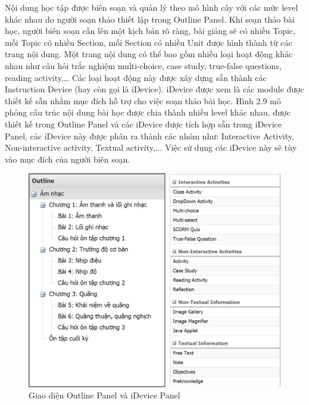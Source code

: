 Nội dung học tập được biên soạn và quản lý theo mô hình cây với các mức level khác nhau do người soạn thảo thiết lập trong Outline Panel. Khi soạn thảo bài học, người biên soạn cần lên một kịch bản rõ ràng, bài giảng sẽ có nhiều Topic, mỗi Topic có nhiều Section, mỗi Section có nhiều Unit được hình thành từ các trang nội dung. Một trang nội dung có thể bao gồm nhiều loại hoạt động khác nhau như câu hỏi trắc nghiệm multi-choice, case study, true-false questions, reading activity,… Các loại hoạt động này được xây dựng sẵn thành các Instruction Device (hay còn gọi là iDevice). iDevice được xem là các module được thiết kế sẵn nhằm mục đích hỗ trợ cho việc soạn thảo bài học. Hình 2.9 mô phỏng cấu trúc nội dung bài học được chia thành nhiều level khác nhau, được thiết kế trong Outline Panel và các iDevice được tích hợp sẵn trong iDevice Panel, các iDevice này được phân ra thành các nhóm như: Interactive Activity, Non-interactive activity, Textual activity,... Việc sử dụng các iDevice này sẽ tùy vào mục đích của người biên soạn.

\newpage

\begin{center}
	\begin{figure}[htp]
		\begin{center}
			\includegraphics[width=15cm]{Chapter2/Pictures/picture29.png}
		\end{center}
		\caption{Giao diện Outline Panel và iDevice Panel}
		\label{refpicture29}
	\end{figure}
\end{center}


